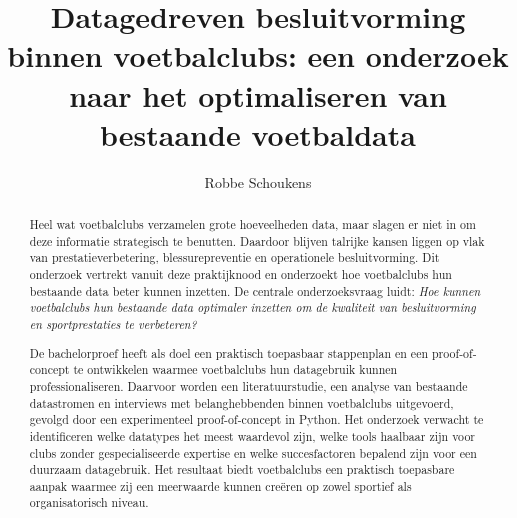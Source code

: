 \documentclass{hogent-article}
\title{Datagedreven besluitvorming binnen voetbalclubs: een onderzoek naar het optimaliseren van bestaande voetbaldata}
\author{Robbe Schoukens}
\begin{document}


\begin{abstract}
  Heel wat voetbalclubs verzamelen grote hoeveelheden data, maar slagen er niet in om deze informatie strategisch te benutten. Daardoor blijven talrijke kansen liggen op vlak van prestatieverbetering, blessurepreventie en operationele besluitvorming.
  Dit onderzoek vertrekt vanuit deze praktijknood en onderzoekt hoe voetbalclubs hun bestaande data beter kunnen inzetten.
  De centrale onderzoeksvraag luidt: \textit{Hoe kunnen voetbalclubs hun bestaande data optimaler inzetten om de kwaliteit van besluitvorming en sportprestaties te verbeteren?}

  De bachelorproef heeft als doel een praktisch toepasbaar stappenplan en een proof-of-concept te ontwikkelen waarmee voetbalclubs hun datagebruik kunnen professionaliseren.
  Daarvoor worden een literatuurstudie, een analyse van bestaande datastromen en interviews met belanghebbenden binnen voetbalclubs uitgevoerd, gevolgd door een experimenteel proof-of-concept in Python.
  Het onderzoek verwacht te identificeren welke datatypes het meest waardevol zijn, welke tools haalbaar zijn voor clubs zonder gespecialiseerde expertise en welke succesfactoren bepalend zijn voor een duurzaam datagebruik.
  Het resultaat biedt voetbalclubs een praktisch toepasbare aanpak waarmee zij een meerwaarde kunnen creëren op zowel sportief als organisatorisch niveau.
\end{abstract}

\tableofcontents



\printbibliography[heading=bibintoc]
\end{document}
